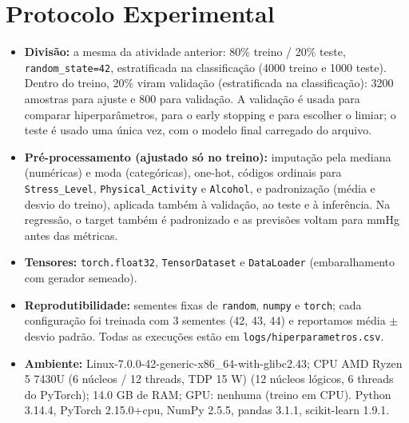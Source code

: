 \documentclass[11pt,a4paper]{article}
\begin{document}
\section{Protocolo Experimental}
\begin{itemize}
\item \textbf{Divisão:} a mesma da atividade anterior: 80\% treino / 20\% teste, \texttt{random\_state=42}, estratificada na classificação
(4000 treino e 1000 teste). Dentro do treino, 20\% viram validação (estratificada na classificação): 3200 amostras para
ajuste e 800 para validação. A validação é usada para comparar hiperparâmetros, para o early stopping e para escolher o limiar;
o teste é usado uma única vez, com o modelo final carregado do arquivo.
\item \textbf{Pré-processamento (ajustado só no treino):} imputação pela mediana (numéricas) e moda (categóricas), one-hot, códigos
ordinais para \texttt{Stress\_Level}, \texttt{Physical\_Activity} e \texttt{Alcohol}, e padronização (média e desvio do treino),
aplicada também à validação, ao teste e à inferência. Na regressão, o target também é padronizado e as previsões voltam para mmHg antes das métricas.
\item \textbf{Tensores:} \texttt{torch.float32}, \texttt{TensorDataset} e \texttt{DataLoader} (embaralhamento com gerador semeado).
\item \textbf{Reprodutibilidade:} sementes fixas de \texttt{random}, \texttt{numpy} e \texttt{torch}; cada configuração foi treinada com
3 sementes (42, 43, 44) e reportamos média $\pm$ desvio padrão. Todas as execuções estão em \texttt{logs/hiperparametros.csv}.
\item \textbf{Ambiente:} Linux-7.0.0-42-generic-x86\_64-with-glibc2.43; CPU AMD Ryzen 5 7430U (6 núcleos / 12 threads, TDP 15 W) (12 núcleos lógicos, 6 threads do PyTorch);
14.0 GB de RAM; GPU: nenhuma (treino em CPU). Python 3.14.4, PyTorch 2.15.0+cpu, NumPy 2.5.5,
pandas 3.1.1, scikit-learn 1.9.1.
\end{itemize}
\end{document}
